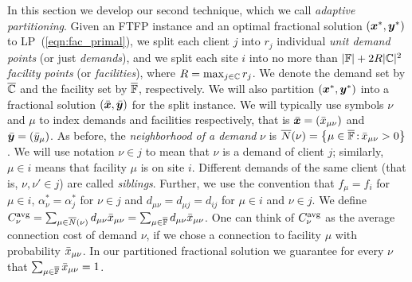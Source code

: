 \documentclass[oneside,final]{ucr}
\begin{document}
In this section we develop our second technique, which we
call \emph{adaptive partitioning}. Given an FTFP instance
and an optimal fractional solution $(\boldsymbol{x}^\ast, \boldsymbol{y}^\ast)$
to LP~(\ref{eqn:fac_primal}), we split each client $j$ into
$r_j$ individual \emph{unit demand points} (or just
\emph{demands}), and we split each site $i$ into no more
than $|\mathbb{F}|+2R|\mathbb{C}|^2$ \emph{facility points} (or
\emph{facilities}), where $R=\max_{j\in\mathbb{C}}r_j$. We
denote the demand set by $\overline{\mathbb{C}}$ and the facility set
by $\overline{\mathbb{F}}$, respectively.  We will also partition
$(\boldsymbol{x}^\ast,\boldsymbol{y}^\ast)$ into a fractional solution
$(\bar{\boldsymbol{x}},\bar{\boldsymbol{y}})$ for the split instance.  We will
typically use symbols $\nu$ and $\mu$ to index demands and
facilities respectively, that is $\bar{\boldsymbol{x}} =
({\bar x}_{\mu\nu})$ and $\bar{\boldsymbol{y}} = ({\bar y}_{\mu})$.  As before,
the \emph{neighborhood of a demand} $\nu$ is
${\overline{N}}(\nu)={ \left\{ \mu\in\overline{\mathbb{F}} {\,:\,}
  {\bar x}_{\mu\nu}>0 \right\} }$.  We will use notation $\nu\in j$ to
mean that $\nu$ is a demand of client $j$; similarly,
$\mu\in i$ means that facility $\mu$ is on site
$i$. Different demands of the same client (that is,
$\nu,\nu'\in j$) are called \emph{siblings}.  Further, we
use the convention that $f_\mu = f_i$ for $\mu\in i$,
$\alpha_\nu^\ast = \alpha_j^\ast$ for $\nu\in j$ and
$d_{\mu\nu} = d_{\mu j} = d_{ij}$ for $\mu\in i$ and $\nu\in
j$.  We define $C^{{\mbox{\scriptsize\rm avg}}}_{\nu}
=\sum_{\mu\in{\overline{N}}(\nu)}d_{\mu\nu}{\bar x}_{\mu\nu} =
\sum_{\mu\in\overline{\mathbb{F}}}d_{\mu\nu}{\bar x}_{\mu\nu}$. 
One can think of $C^{{\mbox{\scriptsize\rm avg}}}_{\nu}$ as the
average connection cost of demand $\nu$, if we chose a
connection to facility $\mu$ with probability
${\bar x}_{\mu\nu}$. In our partitioned fractional solution we
guarantee for every $\nu$ that $\sum_{\mu\in\overline{\mathbb{F}}}
{\bar x}_{\mu\nu}=1$.
\end{document}
